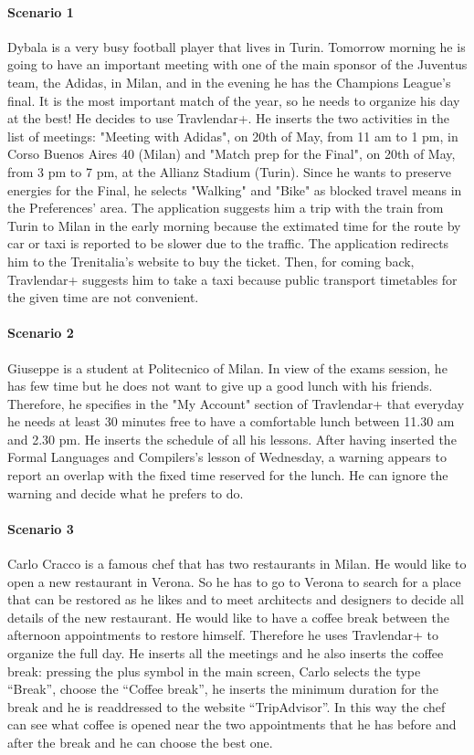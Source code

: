 \documentclass[12pt,titlepage]{article}
\begin{document}
\paragraph{Scenario 1} 
Dybala is a very busy football player that lives in Turin. Tomorrow morning he is going to have an important meeting with one of the main sponsor of the Juventus team, the Adidas, in Milan, and in the evening he has the Champions League's final. It is the most important match of the year, so he needs to organize his day at the best! He decides to use Travlendar+. He inserts the two activities in the list of meetings: "Meeting with Adidas", on 20th of May, from 11 am to 1 pm, in Corso Buenos Aires 40 (Milan) and "Match prep for the Final", on 20th of May, from 3 pm to 7 pm, at the Allianz Stadium (Turin). Since he wants to preserve energies for the Final, he selects "Walking" and "Bike" as blocked travel means in the Preferences' area. The application suggests him a trip with the train from Turin to Milan in the early morning because the extimated time for the route by car or taxi is reported to be slower due to the traffic. The application redirects him to the Trenitalia's website to buy the ticket. Then, for coming back, Travlendar+ suggests him to take a taxi because public transport timetables for the given time are not convenient. 

\paragraph{Scenario 2}
Giuseppe is a student at Politecnico of Milan. In view of the exams session, he has few time but he does not want to give up a good lunch with his friends. Therefore, he specifies in the "My Account" section of Travlendar+ that everyday he needs at least 30 minutes free to have a comfortable lunch between 11.30 am and 2.30 pm. He inserts the schedule of all his lessons. After having inserted the Formal Languages and Compilers's lesson of Wednesday, a warning appears to report an overlap with the fixed time reserved for the lunch. He can ignore the warning and decide what he prefers to do.

\paragraph{Scenario 3}
Carlo Cracco is a famous chef that has two restaurants in Milan. He would like to open a new restaurant in Verona. So he has to go to Verona to search for a place that can be restored as he likes and to meet architects and designers to decide all details of the new restaurant. He would like to have a coffee break between the afternoon appointments to restore himself. Therefore he uses Travlendar+ to organize the full day. He inserts all the meetings and he also inserts the coffee break: pressing the plus symbol in the main screen, Carlo selects the type ``Break'', choose the ``Coffee break'', he inserts the minimum duration for the break and he is readdressed to the website ``TripAdvisor''. In this way the chef can see what coffee is opened near the two appointments that he has before and after the break and he can choose the best one.
\end{document}
